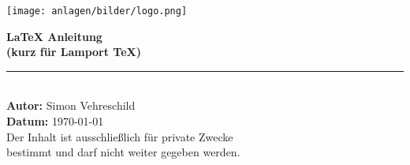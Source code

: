 \begin{titlepage}  %
    \begin{center}

        \vspace*{0.5cm}  %

        \texttt{[image: anlagen/bilder/logo.png]}
        \vspace{1cm}  %

        {\Huge \textbf{\LaTeX{} Anleitung}} \\[0.5cm]
        {\Large \textbf{(kurz für Lamport TeX)}} \\[1.5cm]

        \rule{12cm}{0.5pt} \\[1.5cm]  %

        \textbf{\Large Autor:} \Large Simon Vehreschild \\[0.5cm]
        \textbf{\Large Datum:} \Large \today \\[3cm]

        {Der Inhalt ist ausschließlich für private Zwecke} \\
        {bestimmt und darf nicht weiter gegeben werden.} \\

        \vfill  %
    \end{center}
\end{titlepage}